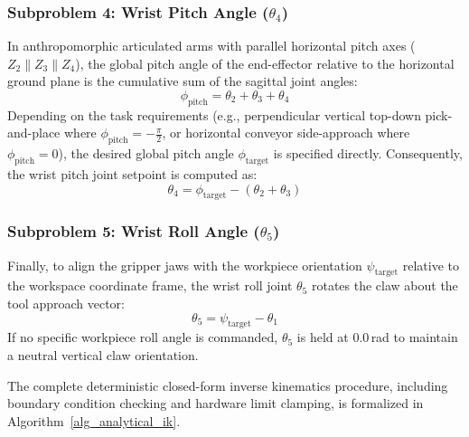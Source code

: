 \documentclass[journal]{IEEEtran}
\begin{document}
\subsubsection{Subproblem 4: Wrist Pitch Angle ($\theta_4$)}
In anthropomorphic articulated arms with parallel horizontal pitch axes ($Z_2 \parallel Z_3 \parallel Z_4$), the global pitch angle of the end-effector relative to the horizontal ground plane is the cumulative sum of the sagittal joint angles:
\begin{equation}
\phi_{\text{pitch}} = \theta_2 + \theta_3 + \theta_4
\end{equation}
Depending on the task requirements (e.g., perpendicular vertical top-down pick-and-place where $\phi_{\text{pitch}} = -\frac{\pi}{2}$, or horizontal conveyor side-approach where $\phi_{\text{pitch}} = 0$), the desired global pitch angle $\phi_{\text{target}}$ is specified directly. Consequently, the wrist pitch joint setpoint is computed as:
\begin{equation}
\theta_4 = \phi_{\text{target}} - (\theta_2 + \theta_3)
\end{equation}

\subsubsection{Subproblem 5: Wrist Roll Angle ($\theta_5$)}
Finally, to align the gripper jaws with the workpiece orientation $\psi_{\text{target}}$ relative to the workspace coordinate frame, the wrist roll joint $\theta_5$ rotates the claw about the tool approach vector:
\begin{equation}
\theta_5 = \psi_{\text{target}} - \theta_1
\end{equation}
If no specific workpiece roll angle is commanded, $\theta_5$ is held at $0.0$\,rad to maintain a neutral vertical claw orientation.

The complete deterministic closed-form inverse kinematics procedure, including boundary condition checking and hardware limit clamping, is formalized in Algorithm~\ref{alg_analytical_ik}.
\end{document}
